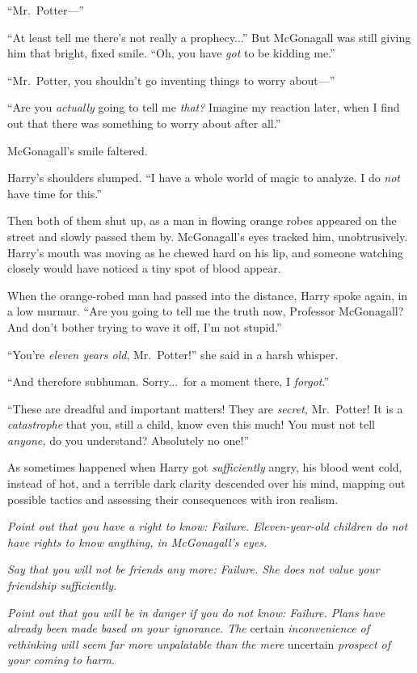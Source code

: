“Mr.~Potter—”

“At least tell me there’s not really a prophecy...” But McGonagall was still giving him that bright, fixed smile. “Oh, you have \emph{got} to be kidding me.”

“Mr.~Potter, you shouldn’t go inventing things to worry about—”

“Are you \emph{actually} going to tell me \emph{that?} Imagine my reaction later, when I find out that there was something to worry about after all.”

McGonagall’s smile faltered.

Harry’s shoulders slumped. “I have a whole world of magic to analyze. I do \emph{not} have time for this.”

Then both of them shut up, as a man in flowing orange robes appeared on the street and slowly passed them by. McGonagall’s eyes tracked him, unobtrusively. Harry’s mouth was moving as he chewed hard on his lip, and someone watching closely would have noticed a tiny spot of blood appear.

When the orange-robed man had passed into the distance, Harry spoke again, in a low murmur. “Are you going to tell me the truth now, Professor McGonagall? And don’t bother trying to wave it off, I’m not stupid.”

“You’re \emph{eleven years old}, Mr.~Potter!” she said in a harsh whisper.

“And therefore subhuman. Sorry...\ for a moment there, I \emph{forgot}.”

“These are dreadful and important matters! They are \emph{secret,} Mr.~Potter! It is a \emph{catastrophe} that you, still a child, know even this much! You must not tell \emph{anyone,} do you understand? Absolutely no one!”

As sometimes happened when Harry got \emph{sufficiently} angry, his blood went cold, instead of hot, and a terrible dark clarity descended over his mind, mapping out possible tactics and assessing their consequences with iron realism.

\emph{Point out that you have a right to know: Failure. Eleven-year-old children do not have rights to know anything, in McGonagall’s eyes.}

\emph{Say that you will not be friends any more: Failure. She does not value your friendship sufficiently.}

\emph{Point out that you will be in danger if you do not know: Failure. Plans have already been made based on your ignorance. The} certain \emph{inconvenience of rethinking will seem far more unpalatable than the mere} uncertain \emph{prospect of your coming to harm.}

